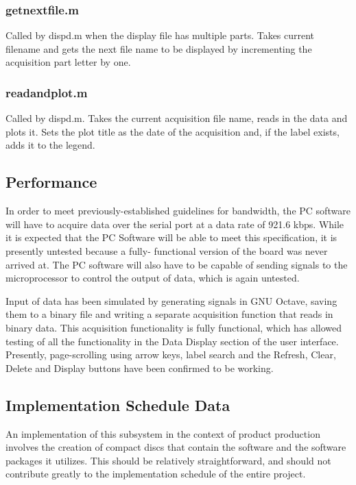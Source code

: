 \subsubsection[getnextfile.m]{getnextfile.m}
Called by dispd.m when the display file has multiple parts. Takes current filename and gets
the next file name to be displayed by incrementing the acquisition part letter by one.


\subsubsection[readandplot.m]{readandplot.m}
Called by dispd.m. Takes the current acquisition file name, reads in the data and plots it.
Sets the plot title as the date of the acquisition and, if the label exists, adds it to the
legend.



\subsection[Performance]{Performance}
In order to meet previously-established guidelines for bandwidth, the PC software will have
to acquire data over the serial port at a data rate of 921.6 kbps. While it is expected that 
the PC Software will be able to meet this specification, it is presently untested because a fully-
functional version of the board was never arrived at. The PC software will also have to be
capable of sending signals to the microprocessor to control the output of data, which is again
untested.

Input of data has been simulated by generating signals in GNU Octave, saving them to a binary
file and writing a separate acquisition function that reads in binary data. This acquisition
functionality is fully functional, which has allowed testing of all the functionality in the 
Data Display section of the user interface. Presently, page-scrolling using arrow keys,
label search and the Refresh, Clear, Delete and Display buttons have been confirmed to be working. 


\subsection[Implementation Schedule Data]{Implementation Schedule Data}
An implementation of this subsystem in the context of product production involves the creation
of compact discs that contain the software and the software packages it utilizes. This should
be relatively straightforward, and should not contribute greatly to the implementation schedule
of the entire project.


